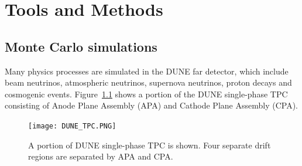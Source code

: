 \chapter{Tools and Methods}
\label{ch:tools}


\section{Monte Carlo simulations}
\label{sec:tools-mc}





Many physics processes are simulated in the DUNE far detector, which include beam neutrinos, atmospheric neutrinos, supernova neutrinos, proton decays and cosmogenic events. Figure~\ref{fig:dune_tpc} shows a portion of the DUNE single-phase TPC consisting of Anode Plane Assembly (APA) and Cathode Plane Assembly (CPA).

\begin{figure}[!ht]
\centering
\texttt{[image: DUNE\_TPC.PNG]}
\caption{A portion of DUNE single-phase TPC is shown. Four separate drift regions are separated by APA and CPA. }
\label{fig:dune_tpc}
\end{figure}

